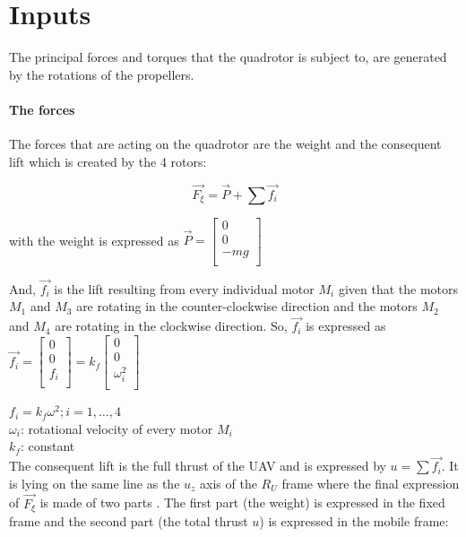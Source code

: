 \documentclass{thesisreport}
\begin{document}
\newpage


\section{Inputs}

The principal forces and torques that the quadrotor is subject to, are generated by the rotations of the propellers. 

\paragraph{The forces} The forces that are acting on the quadrotor are the weight and the consequent lift which is created by the 4 rotors:

\begin{equation}
\overrightarrow{F_{\xi}}= \overrightarrow{P} + \sum \overrightarrow{f_i}
\end{equation} 

with the weight is expressed as 
$ \overrightarrow{P}= \begin{bmatrix}
0 \\ 
0 \\
-mg \\
\end{bmatrix}$

And, $\overrightarrow{f_{i}}$ is the lift resulting from every individual motor $M_i$ given that the motors $M_1$ and $M_3$ are rotating in the counter-clockwise direction and the motors $M_2$ and $M_4$ are rotating in the clockwise direction. So, $\overrightarrow{f_i}$ is expressed as $\overrightarrow{f_i}=\begin{bmatrix}
0 \\ 
0 \\
f_i \\
\end{bmatrix}=k_f \begin{bmatrix}
0 \\ 
0 \\
\omega_i^2 \\
\end{bmatrix} $  

$f_i = k_f \omega^2; i=1,\ldots,4$\\
$\omega_i$: rotational velocity of every motor $M_i$\\
$k_f$: constant\\

The consequent lift is the full thrust of the UAV and is expressed by $u=\sum \overrightarrow{f_i}$. It is lying on the same line as the $u_z$ axis of the $R_U$ frame where the final expression of $\overrightarrow{F_{\xi}}$ is made of two parts . The first part (the weight)  is expressed in the fixed frame and the second part (the total thrust $u$) is expressed in the mobile frame: 
\end{document}
